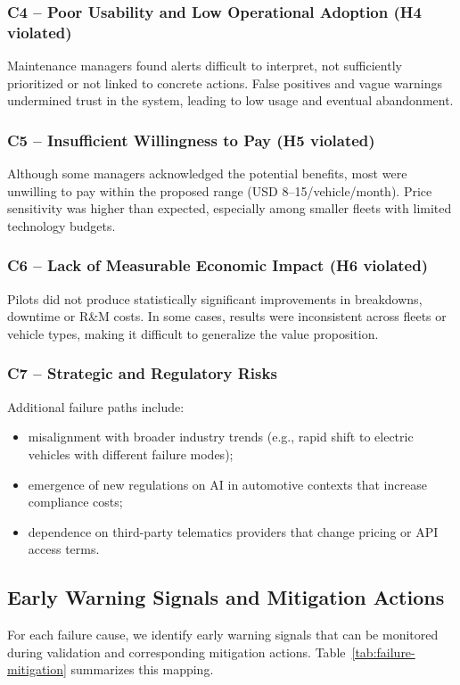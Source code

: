 \documentclass[11pt,a4paper]{article}
\begin{document}
\subsubsection{C4 -- Poor Usability and Low Operational Adoption (H4 violated)}
\noindent Maintenance managers found alerts difficult to interpret, not sufficiently prioritized or not linked to concrete actions. False positives and vague warnings undermined trust in the system, leading to low usage and eventual abandonment.

\subsubsection{C5 -- Insufficient Willingness to Pay (H5 violated)}
\noindent Although some managers acknowledged the potential benefits, most were unwilling to pay within the proposed range (USD 8--15/vehicle/month). Price sensitivity was higher than expected, especially among smaller fleets with limited technology budgets.

\subsubsection{C6 -- Lack of Measurable Economic Impact (H6 violated)}
\noindent Pilots did not produce statistically significant improvements in breakdowns, downtime or R\&M costs. In some cases, results were inconsistent across fleets or vehicle types, making it difficult to generalize the value proposition.

\subsubsection{C7 -- Strategic and Regulatory Risks}
\noindent Additional failure paths include: 
\begin{itemize}
    \item misalignment with broader industry trends (e.g., rapid shift to electric vehicles with different failure modes);
    \item emergence of new regulations on AI in automotive contexts that increase compliance costs; 
    \item dependence on third-party telematics providers that change pricing or API access terms.

\end{itemize}
\subsection{Early Warning Signals and Mitigation Actions}
\noindent For each failure cause, we identify early warning signals that can be monitored during validation and corresponding mitigation actions. Table~\ref{tab:failure-mitigation} summarizes this mapping.
\end{document}

